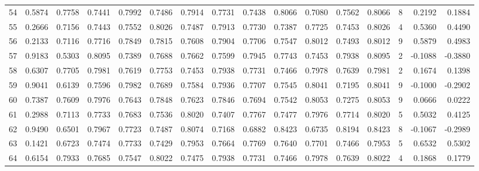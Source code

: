 \begin{tabular}{lrrrrrrrrrrrrrrr}
54  &      0.5874 &  0.7758 &  0.7441 &  0.7992 &  0.7486 &  0.7914 &  0.7731 &  0.7438 &  0.8066 &  0.7080 &   0.7562 &     0.8066 &      8 &                    0.2192 &                     0.1884 \\
55  &      0.2666 &  0.7156 &  0.7443 &  0.7552 &  0.8026 &  0.7487 &  0.7913 &  0.7730 &  0.7387 &  0.7725 &   0.7453 &     0.8026 &      4 &                    0.5360 &                     0.4490 \\
56  &      0.2133 &  0.7116 &  0.7716 &  0.7849 &  0.7815 &  0.7608 &  0.7904 &  0.7706 &  0.7547 &  0.8012 &   0.7493 &     0.8012 &      9 &                    0.5879 &                     0.4983 \\
57  &      0.9183 &  0.5303 &  0.8095 &  0.7389 &  0.7688 &  0.7662 &  0.7599 &  0.7945 &  0.7743 &  0.7453 &   0.7938 &     0.8095 &      2 &                   -0.1088 &                    -0.3880 \\
58  &      0.6307 &  0.7705 &  0.7981 &  0.7619 &  0.7753 &  0.7453 &  0.7938 &  0.7731 &  0.7466 &  0.7978 &   0.7639 &     0.7981 &      2 &                    0.1674 &                     0.1398 \\
59  &      0.9041 &  0.6139 &  0.7596 &  0.7982 &  0.7689 &  0.7584 &  0.7936 &  0.7707 &  0.7545 &  0.8041 &   0.7195 &     0.8041 &      9 &                   -0.1000 &                    -0.2902 \\
60  &      0.7387 &  0.7609 &  0.7976 &  0.7643 &  0.7848 &  0.7623 &  0.7846 &  0.7694 &  0.7542 &  0.8053 &   0.7275 &     0.8053 &      9 &                    0.0666 &                     0.0222 \\
61  &      0.2988 &  0.7113 &  0.7733 &  0.7683 &  0.7536 &  0.8020 &  0.7407 &  0.7767 &  0.7477 &  0.7976 &   0.7714 &     0.8020 &      5 &                    0.5032 &                     0.4125 \\
62  &      0.9490 &  0.6501 &  0.7967 &  0.7723 &  0.7487 &  0.8074 &  0.7168 &  0.6882 &  0.8423 &  0.6735 &   0.8194 &     0.8423 &      8 &                   -0.1067 &                    -0.2989 \\
63  &      0.1421 &  0.6723 &  0.7474 &  0.7733 &  0.7429 &  0.7953 &  0.7664 &  0.7769 &  0.7640 &  0.7701 &   0.7466 &     0.7953 &      5 &                    0.6532 &                     0.5302 \\
64  &      0.6154 &  0.7933 &  0.7685 &  0.7547 &  0.8022 &  0.7475 &  0.7938 &  0.7731 &  0.7466 &  0.7978 &   0.7639 &     0.8022 &      4 &                    0.1868 &                     0.1779 \\

\end{tabular}
